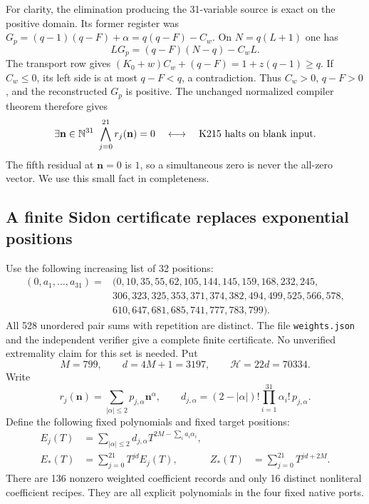 For clarity, the elimination producing the 31-variable source is exact
on the positive domain. Its former register was
$G_p=(q-1)(q-F)+\alpha=q(q-F)-C_w$.
On $N=q(L+1)$ one has
\[
 LG_p=(q-F)(N-q)-C_wL.
\]
The transport row gives
$(K_0+w)C_w+(q-F)=1+z(q-1)\ge q$.
If $C_w\le0$, its left side is at most $q-F<q$, a contradiction.
Thus $C_w>0$, $q-F>0$, and the reconstructed $G_p$ is positive.
The unchanged normalized compiler theorem therefore gives
\begin{equation}
 \exists\mathbf n\in\N^{31}\ \bigwedge_{j=0}^{21}r_j(\mathbf n)=0
 \quad\longleftrightarrow\quad
 \text{K215 halts on blank input}.
 \label{eq:parent-calibration}
\end{equation}
The fifth residual at $\mathbf n=0$ is $1$, so a simultaneous zero
is never the all-zero vector. We use this small fact in completeness.

\subsection{A finite Sidon certificate replaces exponential positions}

Use the following increasing list of 32 positions:
\begin{equation}
\begin{split}
 (0,a_1,\ldots,a_{31})={}&(0,10,35,55,62,105,144,145,159,168,232,245,\\
 &306,323,325,353,371,374,382,494,499,525,566,578,\\
 &610,647,681,685,741,777,783,799).
\end{split}
\label{eq:weights}
\end{equation}
All 528 unordered pair sums with repetition are distinct. The file
\texttt{weights.json} and the independent verifier give a complete
finite certificate. No unverified extremality claim for this set is
needed. Put
\[
 M=799,\qquad d=4M+1=3197,\qquad \mathcal H=22d=70334.
\]
Write
\[
 r_j(\mathbf n)=\sum_{|\alpha|\le2}p_{j,\alpha}\mathbf n^\alpha,
 \qquad
 d_{j,\alpha}=(2-|\alpha|)!\prod_{i=1}^{31}\alpha_i!\,p_{j,\alpha}.
\]
Define the following fixed polynomials and fixed target positions:
\begin{align}
 E_j(T)&=\sum_{|\alpha|\le2}d_{j,\alpha}
                    T^{2M-\sum_i a_i\alpha_i},\nonumber\\
 E_*(T)&=\sum_{j=0}^{21}T^{jd}E_j(T),&
 Z_*(T)&=\sum_{j=0}^{21}T^{jd+2M}.
 \label{eq:kernel}
\end{align}
There are 136 nonzero weighted coefficient records and only 16
distinct nonliteral coefficient recipes. They are all explicit
polynomials in the four fixed native ports.

